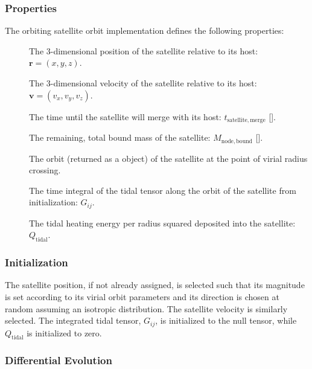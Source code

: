 \subsubsection{Properties}

The orbiting satellite orbit implementation defines the following properties:
\begin{description}
 \item [] The 3-dimensional position of the satellite relative to its host: $\mathbf{r}=(x,y,z)$.
 \item [] The 3-dimensional velocity of the satellite relative to its host: $\mathbf{v}=(v_x,v_y,v_z)$.
 \item [] The time until the satellite will merge with its host: $t_\mathrm{satellite, merge}$ [].
 \item [] The remaining, total bound mass of the satellite: $M_\mathrm{node,bound}$ [].
 \item[] The orbit (returned as a \href{https://github.com/galacticusorg/galacticus/releases/download/bleeding-edge/Galacticus_Development.pdf\#sec.KeplerOrbits} object) of the satellite at the point of virial radius crossing.
 \item[] The time integral of the tidal tensor along the orbit of the satellite from initialization: $G_{ij}$.
 \item[] The tidal heating energy per radius squared deposited into the satellite: $Q_\mathrm{tidal}$.
\end{description}

\subsubsection{Initialization}

The satellite position, if not already assigned, is selected such that its magnitude is set according to its virial orbit parameters and its direction is chosen at random assuming an isotropic distribution.  The satellite velocity is similarly selected.  The integrated tidal tensor, $G_{ij}$, is initialized to the null tensor, while $Q_\mathrm{tidal}$ is initialized to zero.

\subsubsection{Differential Evolution}

